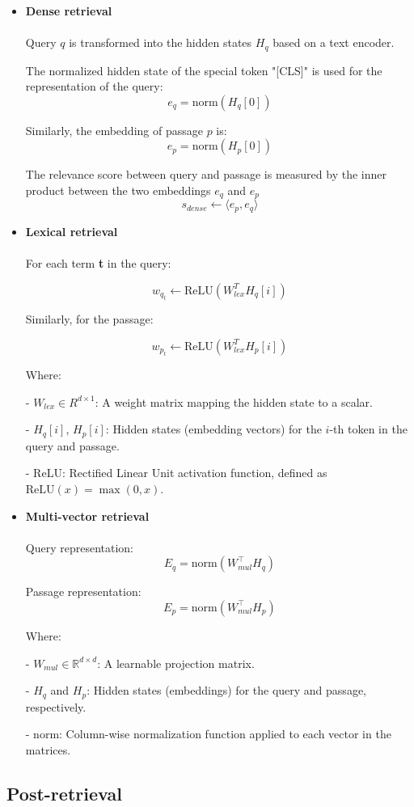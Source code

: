\begin{itemize}
    \item \textbf{Dense retrieval} \\\\
Query $q$ is transformed into the hidden states $H_q$ based on a text encoder.

The normalized hidden state of the special token "[CLS]" is used for the representation of the query:
$$ e_q = \text{norm}(H_q[0]) $$

Similarly, the embedding of passage $p$ is:
$$ e_p = \text{norm}(H_p[0]) $$

The relevance score between query and passage is measured by the inner product between the two embeddings $e_q$ and $e_p$
$$ s_{dense} \leftarrow \langle e_p, e_q \rangle $$
    \item \textbf{Lexical retrieval}\\\\
For each term \textbf{t} in the query:

$$ w_{q_t} \leftarrow \text{ReLU}(W^T_{lex} H_q[i]) $$

Similarly, for the passage:

$$ w_{p_t} \leftarrow \text{ReLU}(W^T_{lex} H_p[i]) $$

Where:

- $W_{lex} \in R^{d \times 1}$: A weight matrix mapping the hidden state to a scalar.

- $H_q[i]$, $H_p[i]$: Hidden states (embedding vectors) for the $i$-th token in the query and passage.

- ReLU: Rectified Linear Unit activation function, defined as $\text{ReLU}(x) = \max(0, x)$.
    \item \textbf{Multi-vector retrieval}\\\\
Query representation:  
  $$ E_q = \text{norm}(W_{mul}^\top H_q) $$

Passage representation:  
  $$ E_p = \text{norm}(W_{mul}^\top H_p) $$
  
Where:

- $W_{mul} \in \mathbb{R}^{d \times d}$: A learnable projection matrix.

- $H_q$ and $H_p$: Hidden states (embeddings) for the query and passage, respectively.

- norm: Column-wise normalization function applied to each vector in the matrices.
\end{itemize}

\subsection{Post-retrieval}

